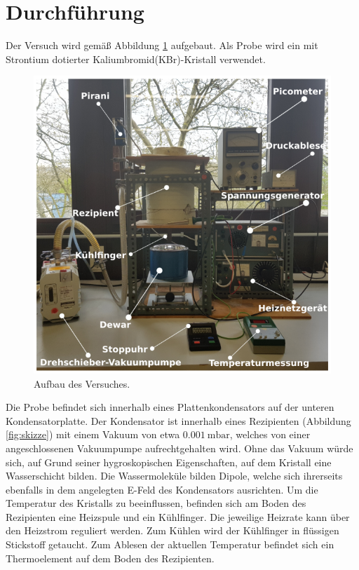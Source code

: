 \section{Durchführung}
\label{sec:Durchführung}

Der Versuch wird gemäß Abbildung \ref{fig:aufbau} aufgebaut. Als Probe wird ein mit Strontium dotierter Kaliumbromid(KBr)-Kristall verwendet.

\begin{figure}
    \centering
    \includegraphics[width=\textwidth]{Bilder/Aufbau.PNG}
    \caption{Aufbau des Versuches.\cite{V48}}
    \label{fig:aufbau}
\end{figure}

Die Probe befindet sich innerhalb eines Plattenkondensators auf der unteren Kondensatorplatte. Der Kondensator ist innerhalb eines Rezipienten (Abbildung \ref{fig:skizze}) mit einem Vakuum von etwa $\SI{0.001}{\milli\bar}$, welches von einer angeschlossenen Vakuumpumpe aufrechtgehalten wird. Ohne das Vakuum würde sich, auf Grund seiner hygroskopischen Eigenschaften, auf dem Kristall eine Wasserschicht bilden. Die Wassermoleküle bilden Dipole, welche sich ihrerseits ebenfalls in dem angelegten E-Feld des Kondensators ausrichten. 
Um die Temperatur des Kristalls zu beeinflussen, befinden sich am Boden des Rezipienten eine Heizspule und ein Kühlfinger. Die jeweilige Heizrate kann über den Heizstrom reguliert werden. Zum Kühlen wird der Kühlfinger in flüssigen Stickstoff getaucht. Zum Ablesen der aktuellen Temperatur befindet sich ein Thermoelement auf dem Boden des Rezipienten. 


